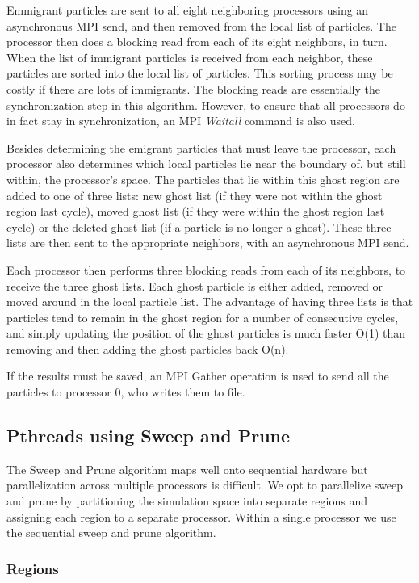\documentclass[11pt]{article} %
\begin{document}
Emmigrant particles are sent to all eight neighboring processors using an asynchronous MPI send, and then removed from the local list of particles. The processor then does a blocking read from each of its eight neighbors, in turn. When the list of immigrant particles is received from each neighbor, these particles are sorted into the local list of particles. This sorting process may be costly if there are lots of immigrants. The blocking reads are essentially the synchronization step in this algorithm. However, to ensure that all processors do in fact stay in synchronization, an MPI {\em Waitall} command is also used.

Besides determining the emigrant particles that must leave the processor, each processor also determines which local particles lie near the boundary of, but still within, the processor's space. The particles that lie within this ghost region are added to one of three lists: new ghost list (if they were not within the ghost region last cycle), moved ghost list (if they were within the ghost region last cycle) or the deleted ghost list (if a particle is no longer a ghost). These three lists are then sent to the appropriate neighbors, with an asynchronous MPI send.

Each processor then performs three blocking reads from each of its neighbors, to receive the three ghost lists. Each ghost particle is either added, removed or moved around in the local particle list. The advantage of having three lists is that particles tend to remain in the ghost region for a number of consecutive cycles, and simply updating the position of the ghost particles is much faster O(1) than removing and then adding the ghost particles back O(n).

If the results must be saved, an MPI Gather operation is used to send all the particles to processor 0, who writes them to file.

\subsection{Pthreads using Sweep and Prune}
The Sweep and Prune algorithm maps well onto sequential hardware but
parallelization across multiple processors is difficult. We opt to
parallelize sweep and prune by partitioning the simulation space into
separate regions and assigning each region to a separate processor.
Within a single processor we use the sequential sweep and prune algorithm. 


\subsubsection{Regions}
\end{document}
